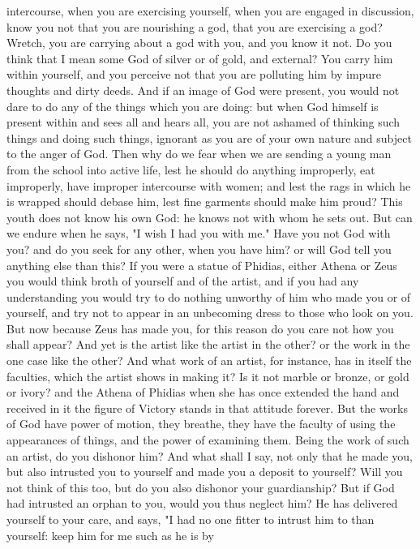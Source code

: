 \documentclass[a4paper]{article}
\begin{document}
intercourse, when you are exercising yourself, when you are engaged in
discussion, know you not that you are nourishing a god, that you are exercising
a god? Wretch, you are carrying about a god with you, and you know it not. Do
you think that I mean some God of silver or of gold, and external? You carry
him within yourself, and you perceive not that you are polluting him by impure
thoughts and dirty deeds. And if an image of God were present, you would not
dare to do any of the things which you are doing: but when God himself is
present within and sees all and hears all, you are not ashamed of thinking such
things and doing such things, ignorant as you are of your own nature and
subject to the anger of God. Then why do we fear when we are sending a young
man from the school into active life, lest he should do anything improperly,
eat improperly, have improper intercourse with women; and lest the rags in
which he is wrapped should debase him, lest fine garments should make him
proud? This youth does not know his own God: he knows not with whom he sets
out. But can we endure when he says, "I wish I had you with me." Have you not
God with you? and do you seek for any other, when you have him? or will God
tell you anything else than this? If you were a statue of Phidias, either
Athena or Zeus you would think broth of yourself and of the artist, and if you
had any understanding you would try to do nothing unworthy of him who made you
or of yourself, and try not to appear in an unbecoming dress to those who look
on you. But now because Zeus has made you, for this reason do you care not how
you shall appear? And yet is the artist like the artist in the other? or the
work in the one case like the other? And what work of an artist, for instance,
has in itself the faculties, which the artist shows in making it? Is it not
marble or bronze, or gold or ivory? and the Athena of Phidias when she has once
extended the hand and received in it the figure of Victory stands in that
attitude forever. But the works of God have power of motion, they breathe, they
have the faculty of using the appearances of things, and the power of examining
them. Being the work of such an artist, do you dishonor him? And what shall I
say, not only that he made you, but also intrusted you to yourself and made you
a deposit to yourself? Will you not think of this too, but do you also dishonor
your guardianship? But if God had intrusted an orphan to you, would you thus
neglect him? He has delivered yourself to your care, and says, "I had no one
fitter to intrust him to than yourself: keep him for me such as he is by
\end{document}

